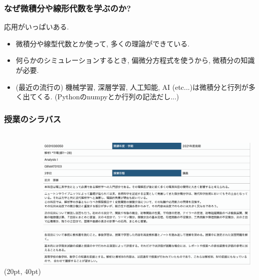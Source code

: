 \documentclass[11pt,dvipdfmx]{beamer}
\theoremstyle{definition}
\theoremstyle{remark}
\begin{document}
\begin{frame}
\frametitle{なぜ微積分や線形代数を学ぶのか?}
   \begin{alertblock}{}
  \begin{center}
応用がいっぱいある.
  \end{center}
 \end{alertblock}
 
  \begin{itemize}
  \item 微積分や線型代数とか使って, 多くの理論ができている.
  \item  何らかのシミュレーションするとき, 偏微分方程式を使うから, 微積分の知識が必要.
  \item (最近の流行の) 機械学習, 深層学習, 人工知能, AI (etc...)は微積分と行列が多く出てくる.
  {\tiny (Pythonのnumpyとか行列の記法だし...)}
 
  \end{itemize}


\end{frame}

\begin{frame}
\frametitle{授業のシラバス}

\begin{textblock*}{0.4\linewidth}(20pt, 40pt)
    \centering
    \includegraphics[height=75mm, width=110mm]{pic.jpg}
\end{textblock*}

\end{frame}
\end{document}
